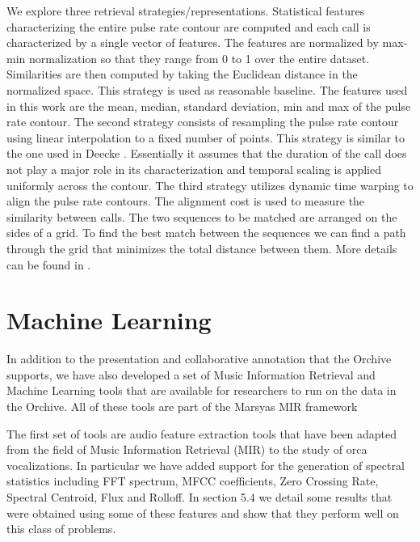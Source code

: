 \documentclass[12pt,oneside]{book}
\begin{document}
We explore three retrieval strategies/representations. Statistical
features characterizing the entire pulse rate contour are computed and
each call is characterized by a single vector of features. The
features are normalized by max-min normalization so that they range
from 0 to 1 over the entire dataset. Similarities are then computed by
taking the Euclidean distance in the normalized space. This strategy
is used as reasonable baseline. The features used in this work are the
mean, median, standard deviation, min and max of the pulse rate
contour. The second strategy consists of resampling the pulse rate
contour using linear interpolation to a fixed number of points. This
strategy is similar to the one used in Deecke
\cite{deecke99_quantifying_orca}. Essentially it assumes that the
duration of the call does not play a major role in its
characterization and temporal scaling is applied uniformly across the
contour. The third strategy utilizes dynamic time warping to align the
pulse rate contours. The alignment cost is used to measure the
similarity between calls. The two sequences to be matched are arranged
on the sides of a grid. To find the best match between the sequences
we can find a path through the grid that minimizes the total distance
between them. More details can be found in \cite{sakoe78}.



\section{Machine Learning}
\label{section:softwareAndSystems:machineLearning}

In addition to the presentation and collaborative annotation that the
Orchive supports, we have also developed a set of Music Information
Retrieval and Machine Learning tools that are available for
researchers to run on the data in the Orchive. All of these tools are
part of the Marsyas \cite{marsyas} MIR framework

The first set of tools are audio feature extraction tools that have
been adapted from the field of Music Information Retrieval
(MIR) \cite{futrelledownie2002} to the study of orca vocalizations.
In particular we have added support for the generation of spectral
statistics including FFT spectrum, MFCC coefficients, Zero Crossing
Rate, Spectral Centroid, Flux and Rolloff.  In section 5.4 we detail
some results that were obtained using some of these features and show
that they perform well on this class of problems.
\end{document}
